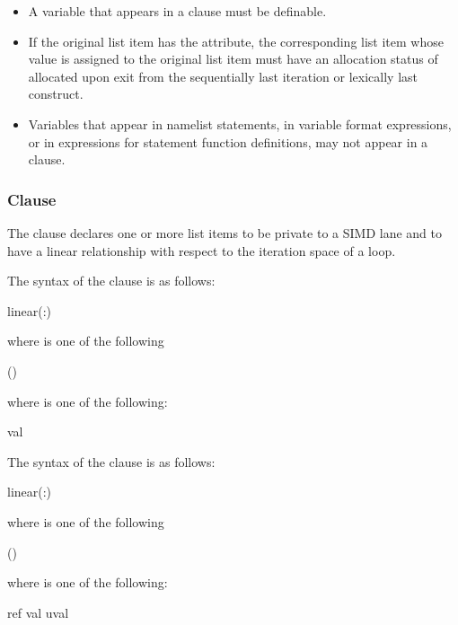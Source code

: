 {{{{\begin{itemize}
\fortranspecificstart
\item A variable that appears in a  clause must be definable.

\item If the original list item has the  attribute, the
    corresponding list item whose value is assigned to the original list item must have an allocation status of allocated upon exit from
    the sequentially last iteration or lexically last  construct.

\item Variables that appear in namelist statements, in variable format expressions, or in 
expressions for statement function definitions, may not appear in a  
clause.
\fortranspecificend
\end{itemize}










\subsubsection{ Clause}
\label{subsubsec:linear clause}
\summary
The  clause declares one or more list items to be private to a SIMD lane and to 
have a linear relationship with respect to the iteration space of a loop.

\syntax


\cspecificstart
The syntax of the  clause is as follows:
\begin{boxedcode}
linear(\plc{linear-list[ }:\plc{ linear-step]})
\end{boxedcode}
where  is one of the following
\begin{indentedcodelist}
()
\end{indentedcodelist}
where   is one of the following:
\begin{indentedcodelist}
val
\end{indentedcodelist}
\cspecificend

\cppspecificstart
The syntax of the  clause is as follows:
\begin{boxedcode}
linear(\plc{linear-list[ }:\plc{ linear-step]})
\end{boxedcode}
where  is one of the following
\begin{indentedcodelist}
()
\end{indentedcodelist}
where   is one of the following:
\begin{indentedcodelist}
ref
val
uval
\end{indentedcodelist}
\cppspecificend

}}}}
